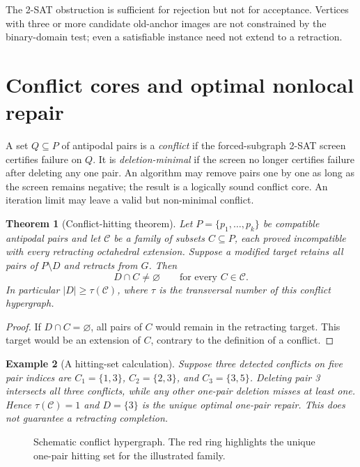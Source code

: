 \documentclass[11pt]{article}
\newtheorem{theorem}{Theorem}[section]
\newtheorem{example}[theorem]{Example}
\begin{document}
The 2-SAT obstruction is sufficient for rejection but not for acceptance.
Vertices with three or more candidate old-anchor images are not
constrained by the binary-domain test; even a satisfiable instance
need not extend to a retraction.

\section{Conflict cores and optimal nonlocal repair}
A set \(Q\subseteq P\) of antipodal pairs is a \emph{conflict}
if the forced-subgraph 2-SAT screen certifies failure on \(Q\).
It is \emph{deletion-minimal} if the screen no longer certifies
failure after deleting any one pair. An algorithm may remove
pairs one by one as long as the screen remains negative; the result
is a logically sound conflict core. An iteration limit may leave
a valid but non-minimal conflict.

\begin{theorem}[Conflict-hitting theorem]
\label{thm:hitting}
Let \(P=\{p_1,\ldots,p_k\}\) be compatible antipodal pairs and
let \(\mathcal C\) be a family of subsets \(C\subseteq P\), each
proved incompatible with every retracting octahedral extension.
Suppose a modified target retains all pairs of \(P\setminus D\)
and retracts from \(G\). Then
\[
             D\cap C\ne\varnothing
               \qquad\text{for every } C\in\mathcal C.
\]
In particular \(|D|\ge\tau(\mathcal C)\), where \(\tau\) is the
transversal number of this conflict hypergraph.
\end{theorem}
\begin{proof}
If \(D\cap C=\varnothing\), all pairs of \(C\) would remain
in the retracting target. This target would be an extension of
\(C\), contrary to the definition of a conflict.
\end{proof}

\begin{example}[A hitting-set calculation]
Suppose three detected conflicts on five pair indices are
\(C_1=\{1,3\}\), \(C_2=\{2,3\}\), and \(C_3=\{3,5\}\).
Deleting pair 3 intersects all three conflicts, while any
other one-pair deletion misses at least one. Hence
\(\tau(\mathcal C)=1\) and \(D=\{3\}\) is the unique optimal
one-pair repair. This does \emph{not} guarantee a retracting completion.
\end{example}

\begin{figure}[ht]
\centering
{}
\caption{Schematic conflict hypergraph. The red ring highlights the unique one-pair hitting set for the illustrated family.}
\end{figure}
\end{document}
